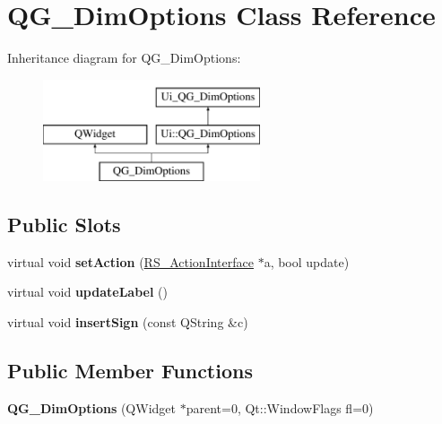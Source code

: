 \hypertarget{classQG__DimOptions}{\section{Q\-G\-\_\-\-Dim\-Options Class Reference}
\label{classQG__DimOptions}
}
Inheritance diagram for Q\-G\-\_\-\-Dim\-Options\-:\begin{figure}[H]
\begin{center}
\leavevmode
\includegraphics[height=3.000000cm]{classQG__DimOptions}
\end{center}
\end{figure}
\subsection*{Public Slots}
\begin{DoxyCompactItemize}
\item 
\hypertarget{classQG__DimOptions_a4baf36d8003ad533e26157019ae4d471}{virtual void {\bfseries set\-Action} (\hyperlink{classRS__ActionInterface}{R\-S\-\_\-\-Action\-Interface} $\ast$a, bool update)}\label{classQG__DimOptions_a4baf36d8003ad533e26157019ae4d471}

\item 
\hypertarget{classQG__DimOptions_a8cfa8b50e1823d7d8c97c63b86d85f83}{virtual void {\bfseries update\-Label} ()}\label{classQG__DimOptions_a8cfa8b50e1823d7d8c97c63b86d85f83}

\item 
\hypertarget{classQG__DimOptions_a4a7a9040a0fe0a06835b29d51d2e91d9}{virtual void {\bfseries insert\-Sign} (const Q\-String \&c)}\label{classQG__DimOptions_a4a7a9040a0fe0a06835b29d51d2e91d9}

\end{DoxyCompactItemize}
\subsection*{Public Member Functions}
\begin{DoxyCompactItemize}
\item 
\hypertarget{classQG__DimOptions_a1cc48a39b4fcfa806d7e8f9283802000}{{\bfseries Q\-G\-\_\-\-Dim\-Options} (Q\-Widget $\ast$parent=0, Qt\-::\-Window\-Flags fl=0)}\label{classQG__DimOptions_a1cc48a39b4fcfa806d7e8f9283802000}

\end{DoxyCompactItemize}
